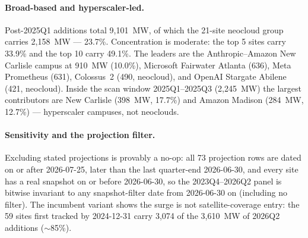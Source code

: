 \documentclass[11pt]{article}
\begin{document}
\paragraph{Broad-based and hyperscaler-led.} Post-2025Q1 additions total
9{,}101~MW, of which the 21-site neocloud group carries 2{,}158~MW ---
23.7\%. Concentration is moderate: the top 5 sites carry 33.9\% and the top
10 carry 49.1\%. The leaders are the Anthropic--Amazon New Carlisle campus at
910~MW (10.0\%), Microsoft Fairwater Atlanta (636), Meta Prometheus (631),
Colossus~2 (490, neocloud), and OpenAI Stargate Abilene (421, neocloud).
Inside the scan window 2025Q1--2025Q3 (2{,}245~MW) the largest contributors
are New Carlisle (398~MW, 17.7\%) and Amazon Madison (284~MW, 12.7\%) ---
hyperscaler campuses, not neoclouds.

\paragraph{Sensitivity and the projection filter.} Excluding stated
projections is provably a no-op: all 73 projection rows are dated on or after
2026-07-25, later than the last quarter-end 2026-06-30, and every site has a
real snapshot on or before 2026-06-30, so the 2023Q4--2026Q2 panel is bitwise
invariant to any snapshot-filter date from 2026-06-30 on (including no
filter). The incumbent variant shows the surge is not satellite-coverage
entry: the 59 sites first tracked by 2024-12-31 carry 3{,}074 of the
3{,}610~MW of 2026Q2 additions ($\sim$85\%).
\end{document}

